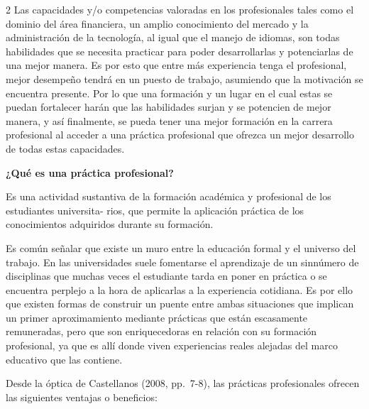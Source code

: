 \documentclass[12pt,spanish,Letterpaper,openany]{book}
\begin{document}
\begin {multicols}{2}
Las capacidades y/o competencias valoradas en los profesionales tales como el dominio del área financiera, un amplio conocimiento del mercado y la administración de la tecnología, al igual que el manejo de idiomas, son todas habilidades que se necesita practicar para poder desarrollarlas y potenciarlas de una mejor manera. Es por esto que entre más experiencia tenga el profesional, mejor desempeño tendrá en un puesto de trabajo, asumiendo que la motivación se encuentra presente. Por lo que una formación y un lugar en el cual estas se puedan fortalecer harán que las habilidades surjan y se potencien de mejor manera, y así finalmente, se pueda tener una mejor formación en la carrera profesional al acceder a una práctica profesional que ofrezca un mejor desarrollo de todas estas capacidades.

\textbf{¿Qué es una práctica profesional?}

Es una actividad sustantiva de la formación académica y profesional de los estudiantes universita-
rios, que permite la aplicación práctica de los conocimientos adquiridos durante su formación.

Es común señalar que existe un muro entre la educación formal y el universo del trabajo. En las universidades suele fomentarse el aprendizaje de un sinnúmero de disciplinas que muchas veces el estudiante tarda en poner en práctica o se encuentra perplejo a la hora de aplicarlas a la experiencia cotidiana. Es por ello que existen formas de construir un puente entre ambas situaciones que implican un primer aproximamiento mediante prácticas que están escasamente remuneradas, pero que son enriquecedoras en relación con su formación profesional, ya que es allí donde viven experiencias reales alejadas del marco educativo que las contiene.

Desde la óptica de Castellanos (2008, pp.~7-8), las prácticas profesionales ofrecen las siguientes ventajas o beneficios:


\end{multicols}
\end{document}
